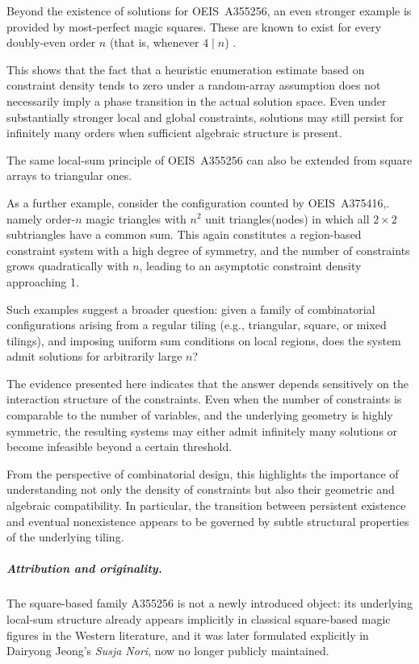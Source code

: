 \documentclass[11pt]{article}
\theoremstyle{plain}
\theoremstyle{definition}
\begin{document}
Beyond the existence of solutions for OEIS~A355256, an even stronger
example is provided by most-perfect magic squares. These are known to
exist for every doubly-even order \(n\) (that is, whenever \(4\mid n\))
\cite{OllerenshawBree1998}.

This shows that the fact that a heuristic enumeration estimate based on
constraint density tends to zero under a random-array assumption does
not necessarily imply a phase transition in the actual solution space.
Even under substantially stronger local and global constraints,
solutions may still persist for infinitely many orders when sufficient
algebraic structure is present.


The same local-sum principle of OEIS~A355256 can also be extended from square arrays to
triangular ones.


As a further example, consider the configuration counted by OEIS~A375416,\cite{OEISA375416}.
namely order-$n$ magic triangles with $n^2$ unit triangles(nodes) in which all $2\times2$ subtriangles have a
common sum. This again constitutes a region-based constraint system with a
high degree of symmetry, and the number of constraints grows quadratically
with $n$, leading to an asymptotic constraint density approaching 1.


Such examples suggest a broader question: given a family of combinatorial
configurations arising from a regular tiling (e.g., triangular, square, or
mixed tilings), and imposing uniform sum conditions on local regions, does
the system admit solutions for arbitrarily large $n$?

The evidence presented here indicates that the answer depends sensitively on
the interaction structure of the constraints. Even when the number of
constraints is comparable to the number of variables, and the underlying
geometry is highly symmetric, the resulting systems may either admit
infinitely many solutions or become infeasible beyond a certain threshold.

From the perspective of combinatorial design, this highlights the importance
of understanding not only the density of constraints but also their geometric
and algebraic compatibility. In particular, the transition between persistent
existence and eventual nonexistence appears to be governed by subtle structural
properties of the underlying tiling.
\subparagraph{Attribution and originality.}

The square-based family A355256 is not a newly introduced object: its
underlying local-sum structure already appears implicitly in classical
square-based magic figures in the Western literature, and it was later
formulated explicitly in Dairyong Jeong’s \textit{Susja Nori}\cite{JeongSite,JeongQuadrangle,JeongOdd,JeongEven}, now no
longer publicly maintained.
\end{document}
